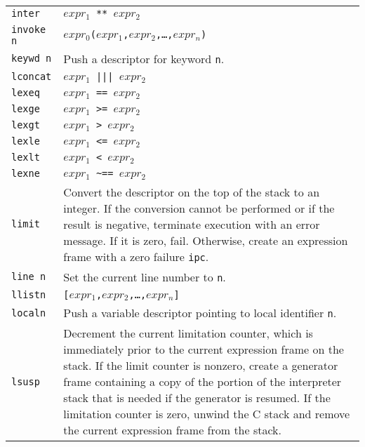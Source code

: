 \begin{xtabular}{l@{\hspace{1.5cm}}p{13.5cm}}
\texttt{inter}  & \texttt{$expr_1$ ** $expr_2$}\\

\texttt{invoke n} & \texttt{$expr_0$($expr_1$,$expr_2$,\dots,$expr_n$)}\\

\texttt{keywd n} & Push a descriptor for keyword \texttt{n}.\\

\texttt{lconcat} & \texttt{$expr_1$ ||| $expr_2$}\\

\texttt{lexeq}   & \texttt{$expr_1$ == $expr_2$}\\

\texttt{lexge}   & \texttt{$expr_1$ >= $expr_2$}\\

\texttt{lexgt}   & \texttt{$expr_1$ > $expr_2$}\\

\texttt{lexle}   & \texttt{$expr_1$ <= $expr_2$}\\

\texttt{lexlt}   & \texttt{$expr_1$ < $expr_2$}\\

\texttt{lexne}   & \texttt{$expr_1$ \textasciitilde== $expr_2$}\\

\texttt{limit}   & Convert the descriptor on the top of the stack to an
integer. If the conversion cannot be performed or if the result is
negative, terminate execution with an error message. If it is zero,
fail. Otherwise, create an expression frame with a zero failure \texttt{ipc}.\\

\texttt{line n}  & Set the current line number to \texttt{n}.\\

\texttt{llistn } & \texttt{[$expr_1$,$expr_2$,\dots,$expr_n$]}\\

\texttt{localn } & Push a variable descriptor pointing to local identifier \texttt{n}.\\

\texttt{lsusp}   & Decrement the current limitation counter, which is
immediately prior to the current expression frame on the stack. If the
limit counter is nonzero, create a generator frame containing a copy
of the portion of the interpreter stack that is needed if the
generator is resumed. If the limitation counter is zero, unwind the C
stack and remove the current expression frame from the stack.\\


\end{xtabular}
